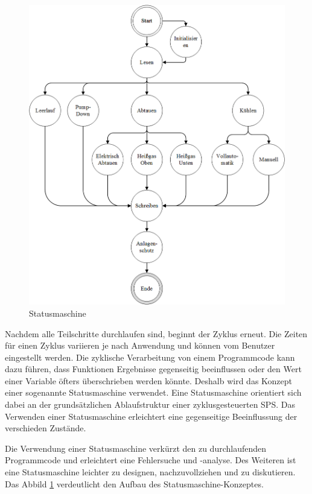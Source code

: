 \begin{figure}%
\centering		\includegraphics[width=1\textwidth]{Pictures/SM.png}
\caption{Statusmaschine}
\label{fig:SM}
\end{figure}


Nachdem alle Teilschritte durchlaufen sind, beginnt der Zyklus erneut. Die Zeiten für einen Zyklus variieren je nach Anwendung und können vom Benutzer eingestellt werden. Die zyklische Verarbeitung von einem Programmcode kann dazu führen, dass Funktionen Ergebnisse gegenseitig beeinflussen oder den Wert einer Variable öfters überschrieben werden könnte. Deshalb wird das Konzept einer sogenannte Statusmaschine verwendet. Eine Statusmaschine orientiert sich dabei an der grundsätzlichen Ablaufstruktur einer zyklusgesteuerten SPS. Das Verwenden einer Statusmaschine erleichtert eine gegenseitige Beeinflussung der verschieden Zustände. 

Die Verwendung einer Statusmaschine verkürzt den zu durchlaufenden Programmcode und erleichtert eine Fehlersuche und -analyse. Des Weiteren ist eine Statusmaschine leichter zu designen, nachzuvollziehen und zu diskutieren. Das Abbild \ref{fig:SM} verdeutlicht den Aufbau des Statusmaschine-Konzeptes. 

